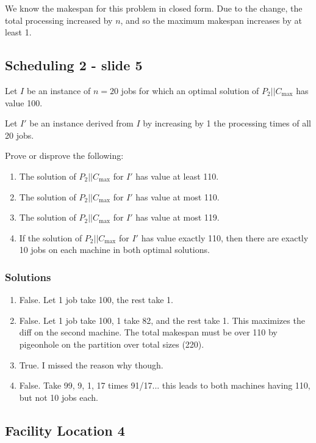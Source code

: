 \documentclass{idc_msc}
\begin{document}
We know the makespan for this problem in closed form.
Due to the change, the total processing increased by \(n\), and so the maximum makespan increases by at least 1.

\subsection{Scheduling 2 - slide 5}

Let \(I\) be an instance of \(n=20\) jobs for which an optimal solution of \(P_2||C_{\max}\) has value 100.

Let \(I'\) be an instance derived from \(I\) by increasing by 1 the processing times of all 20 jobs.

Prove or disprove the following:

\begin{enumerate}
  \item The solution of \(P_2||C_{\max}\) for \(I'\) has value at least 110.
  \item The solution of \(P_2||C_{\max}\) for \(I'\) has value at most 110.
  \item The solution of \(P_2||C_{\max}\) for \(I'\) has value at most 119.
  \item If the solution of \(P_2||C_{\max}\) for \(I'\) has value exactly 110, then there are exactly 10 jobs on each machine in both optimal solutions.
\end{enumerate}

\subsubsection{Solutions}

\begin{enumerate}
  \item False. Let 1 job take 100, the rest take 1.
  \item False. Let 1 job take 100, 1 take 82, and the rest take 1. This maximizes the diff on the second machine. The total makespan must be over 110 by pigeonhole on the partition over total sizes (220).
  \item True. I missed the reason why though.
  \item False. Take 99, 9, 1, 17 times 91/17... this leads to both machines having 110, but not 10 jobs each.
\end{enumerate}

\subsection{Facility Location 4}
\end{document}
